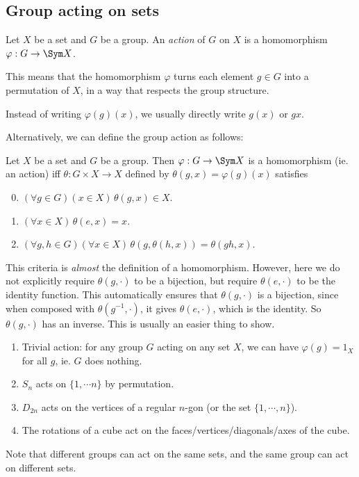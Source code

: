 \documentclass[a4paper]{article}
\begin{document}
\subsection{Group acting on sets}
\begin{defi}
  Let $X$ be a set and $G$ be a group. An \emph{action} of $G$ on $X$ is a homomorphism $\varphi: G \to \Sym X$.
\end{defi}
This means that the homomorphism $\varphi$ turns each element $g\in G$ into a permutation of $X$, in a way that respects the group structure.

Instead of writing $\varphi(g)(x)$, we usually directly write $g(x)$ or $gx$.

Alternatively, we can define the group action as follows:
\begin{prop}
  Let $X$ be a set and $G$ be a group. Then $\varphi: G \to \Sym X$ is a homomorphism (ie. an action) iff $\theta: G\times X \to X$ defined by $\theta(g, x) = \varphi(g)(x)$ satisfies
  \begin{enumerate}[label=\arabic{*}.]
      \setcounter{enumi}{-1}
    \item $(\forall g\in G)(x\in X)\,\theta(g, x)\in X$.
    \item $(\forall x\in X)\,\theta(e, x) = x$.
    \item $(\forall g, h\in G)(\forall x\in X)\,\theta(g, \theta (h, x)) = \theta(gh, x)$.
  \end{enumerate}
\end{prop}
This criteria is \emph{almost} the definition of a homomorphism. However, here we do not explicitly require $\theta(g, \cdot)$ to be a bijection, but require $\theta(e, \cdot)$ to be the identity function. This automatically ensures that $\theta(g, \cdot)$ is a bijection, since when composed with $\theta(g^{-1}, \cdot)$, it gives $\theta(e, \cdot)$, which is the identity. So $\theta(g, \cdot)$ has an inverse. This is usually an easier thing to show.

\begin{eg}\leavevmode
  \begin{enumerate}
    \item Trivial action: for any group $G$ acting on any set $X$, we can have $\varphi(g) = 1_X$ for all $g$, ie. $G$ does nothing.
    \item $S_n$ acts on $\{1, \cdots n\}$ by permutation.
    \item $D_{2n}$ acts on the vertices of a regular $n$-gon (or the set $\{1, \cdots, n\}$).
    \item The rotations of a cube act on the faces/vertices/diagonals/axes of the cube.
  \end{enumerate}
\end{eg}
Note that different groups can act on the same sets, and the same group can act on different sets.
\end{document}
